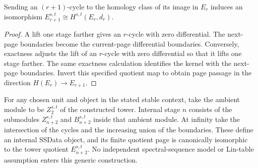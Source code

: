 \begin{proposition}
  \label{prop:h6-tower-page-passage}
  \notready
  Sending an $(r+1)$-cycle to the homology class of its image in $E_r$
  induces an isomorphism $E_{r+1}^{s,t}\cong H^{s,t}(E_r,d_r)$.
\end{proposition}
\begin{proof}
  A lift one stage farther gives an $r$-cycle with zero differential.
  The next-page boundaries become the current-page differential boundaries.
  Conversely, exactness adjusts the lift of an $r$-cycle with zero
  differential so that it lifts one stage farther.  The same exactness
  calculation identifies the kernel with the next-page boundaries.
  Invert this specified quotient map to obtain page passage in the
  direction $H(E_r)\to E_{r+1}$.
\end{proof}

\begin{definition}
  \label{def:h6-tower-internal-data}
  \leanok
  For any chosen unit and object in the stated stable context, take the
  ambient module to be $Z_2^{s,t}$ of the constructed tower. Internal stage
  $n$ consists of the submodules $Z_{n+2}^{s,t}$ and $B_{n+2}^{s,t}$ inside
  that ambient module. At infinity take the intersection of the cycles
  and the increasing union of the boundaries. These define an internal
  SSData object, and its finite quotient page is canonically isomorphic
  to the tower quotient $E_{n+2}^{s,t}$. No independent spectral-sequence
  model or Lin-table assumption enters this generic construction.
\end{definition}


